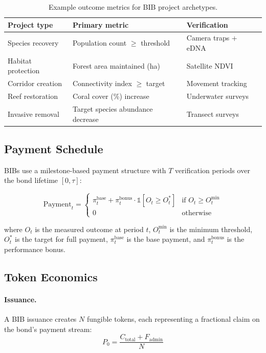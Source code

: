 \documentclass[11pt,a4paper]{article}
\begin{document}
\begin{table}[H]
\centering
\caption{Example outcome metrics for BIB project archetypes.}
\label{tab:metrics}
\begin{tabular}{p{3cm}p{4cm}p{4cm}}
\toprule
\textbf{Project type} & \textbf{Primary metric} & \textbf{Verification} \\
\midrule
Species recovery & Population count $\geq$ threshold & Camera traps + eDNA \\
Habitat protection & Forest area maintained (ha) & Satellite NDVI \\
Corridor creation & Connectivity index $\geq$ target & Movement tracking \\
Reef restoration & Coral cover (\%) increase & Underwater surveys \\
Invasive removal & Target species abundance decrease & Transect surveys \\
\bottomrule
\end{tabular}
\end{table}

\subsection{Payment Schedule}

BIBs use a milestone-based payment structure with $T$ verification
periods over the bond lifetime $[0, \tau]$:

\begin{equation}
  \text{Payment}_t = \begin{cases}
    \pi_t^{\text{base}} + \pi_t^{\text{bonus}} \cdot \mathbb{1}[O_t \geq O_t^*]
    & \text{if } O_t \geq O_t^{\min} \\
    0 & \text{otherwise}
  \end{cases}
\end{equation}

where $O_t$ is the measured outcome at period $t$, $O_t^{\min}$ is the
minimum threshold, $O_t^*$ is the target for full payment,
$\pi_t^{\text{base}}$ is the base payment, and $\pi_t^{\text{bonus}}$
is the performance bonus.

\subsection{Token Economics}

\paragraph{Issuance.} A BIB issuance creates $N$ fungible tokens,
each representing a fractional claim on the bond's payment stream:
\begin{equation}
  P_0 = \frac{C_{\text{total}} + F_{\text{admin}}}{N}
\end{equation}
\end{document}
